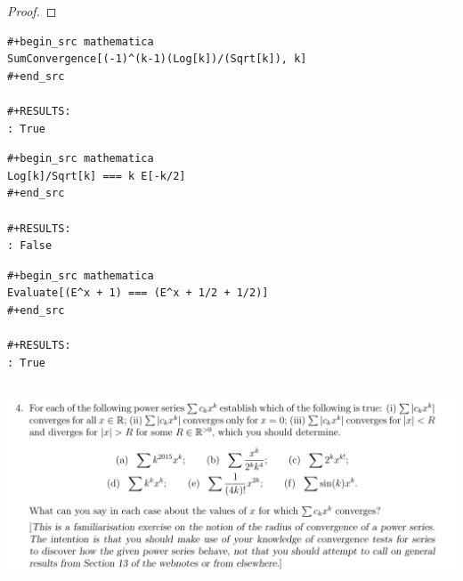 \documentclass[12pt]{article}
\begin{document}
\begin{enumerate}[label=(\alph*)]
\begin{proof}





  \end{proof}

\begin{verbatim}
#+begin_src mathematica
SumConvergence[(-1)^(k-1)(Log[k])/(Sqrt[k]), k]
#+end_src

#+RESULTS:
: True

\end{verbatim}

\begin{verbatim}
#+begin_src mathematica
Log[k]/Sqrt[k] === k E[-k/2]
#+end_src

#+RESULTS:
: False

\end{verbatim}


\begin{verbatim}
#+begin_src mathematica
Evaluate[(E^x + 1) === (E^x + 1/2 + 1/2)]
#+end_src

#+RESULTS:
: True

\end{verbatim}



\end{enumerate}

\newpage
\subsection{}
\begin{mdframed}
\includegraphics[width=400pt]{img/analysis--oxford-M2-I-6-4.png}
\end{mdframed}
\end{document}
